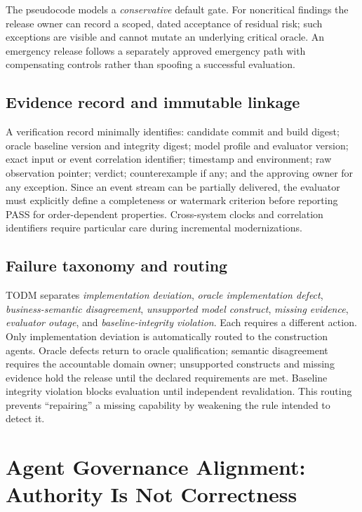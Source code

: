 \documentclass[11pt,a4paper]{article}
\newcommand{\PASS}{\textsf{PASS}}
\begin{document}
The pseudocode models a \emph{conservative} default gate. For noncritical findings the release owner can record a scoped, dated acceptance of residual risk; such exceptions are visible and cannot mutate an underlying critical oracle. An emergency release follows a separately approved emergency path with compensating controls rather than spoofing a successful evaluation.

\subsection{Evidence record and immutable linkage}
A verification record minimally identifies: candidate commit and build digest; oracle baseline version and integrity digest; model profile and evaluator version; exact input or event correlation identifier; timestamp and environment; raw observation pointer; verdict; counterexample if any; and the approving owner for any exception. Since an event stream can be partially delivered, the evaluator must explicitly define a completeness or watermark criterion before reporting \PASS{} for order-dependent properties. Cross-system clocks and correlation identifiers require particular care during incremental modernizations.

\subsection{Failure taxonomy and routing}
TODM separates \emph{implementation deviation}, \emph{oracle implementation defect}, \emph{business-semantic disagreement}, \emph{unsupported model construct}, \emph{missing evidence}, \emph{evaluator outage}, and \emph{baseline-integrity violation}. Each requires a different action. Only implementation deviation is automatically routed to the construction agents. Oracle defects return to oracle qualification; semantic disagreement requires the accountable domain owner; unsupported constructs and missing evidence hold the release until the declared requirements are met. Baseline integrity violation blocks evaluation until independent revalidation. This routing prevents ``repairing'' a missing capability by weakening the rule intended to detect it.

\section{Agent Governance Alignment: Authority Is Not Correctness}
\end{document}
